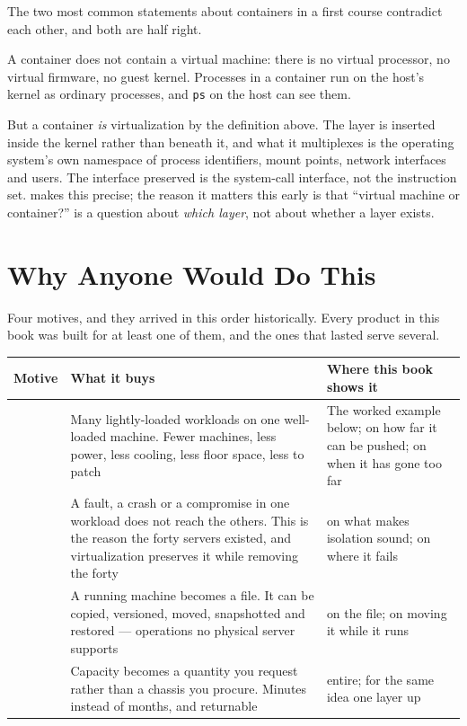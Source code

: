 \begin{alertbox}
The two most common statements about containers in a first course contradict
each other, and both are half right.

\smallskip
A container does not contain a virtual machine: there is no virtual processor,
no virtual firmware, no guest kernel. Processes in a container run on the host's
kernel as ordinary processes, and \texttt{ps} on the host can see them.

\smallskip
But a container \emph{is} virtualization by the definition above. The layer is
inserted inside the kernel rather than beneath it, and what it multiplexes is
the operating system's own namespace of process identifiers, mount points,
network interfaces and users. The interface preserved is the system-call
interface, not the instruction set.  makes this precise; the
reason it matters this early is that ``virtual machine or container?'' is a
question about \emph{which layer}, not about whether a layer exists.
\end{alertbox}

\section{Why Anyone Would Do This}

Four motives, and they arrived in this order historically. Every product in this
book was built for at least one of them, and the ones that lasted serve several.

\begin{longtable}{@{}L{2.9cm}L{6.3cm}L{5.8cm}@{}}
\toprule
{}
\textbf{Motive} & \textbf{What it buys} & \textbf{Where this book shows it} \\
\midrule
\endhead
{} & Many lightly-loaded workloads on one well-loaded
machine. Fewer machines, less power, less cooling, less floor space, less to
patch & The worked example below;  on how far it can be pushed;
 on when it has gone too far \\
 & A fault, a crash or a compromise in one workload does not
reach the others. This is the reason the forty servers existed, and
virtualization preserves it while removing the forty &  on what makes
isolation sound;  on where it fails \\
 & A running machine becomes a file. It can be copied,
versioned, moved, snapshotted and restored --- operations no physical server
supports &  on the file;  on moving it while it
runs \\
 & Capacity becomes a quantity you request rather than a
chassis you procure. Minutes instead of months, and returnable & 
entire;  for the same idea one layer up \\
\bottomrule
\end{longtable}

